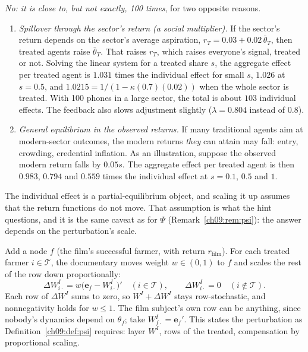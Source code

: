 \documentclass[../solutions_manual.tex]{subfiles}
\begin{document}
 \emph{No: it is close to, but not exactly, 100 times}, for two opposite reasons.
\begin{enumerate}
\item \emph{Spillover through the sector's return (a social multiplier).} If the sector's return depends on the sector's average aspiration, $r_T = 0.03 + 0.02\,\bar\theta_T$, then treated agents raise $\bar\theta_T$. That raises $r_T$, which raises everyone's signal, treated or not. Solving the linear system for a treated share $s$, the aggregate effect per treated agent is $1.031$ times the individual effect for small $s$, $1.026$ at $s = 0.5$, and $1.0215 = 1/(1 - \kappa(0.7)(0.02))$ when the whole sector is treated. With 100 phones in a large sector, the total is about $103$ individual effects. The feedback also slows adjustment slightly ($\lambda = 0.804$ instead of $0.8$).
\item \emph{General equilibrium in the observed returns.} If many traditional agents aim at modern-sector outcomes, the modern returns \emph{they} can attain may fall: entry, crowding, credential inflation. As an illustration, suppose the observed modern return falls by $0.05s$. The aggregate effect per treated agent is then $0.983$, $0.794$ and $0.559$ times the individual effect at $s = 0.1$, $0.5$ and $1$.
\end{enumerate}
The individual effect is a partial-equilibrium object, and scaling it up assumes that the return functions do not move. That assumption is what the hint questions, and it is the same caveat as for $\Psi$ (Remark~\ref{ch09:rem:psi}): the answer depends on the perturbation's scale.


 Add a node $f$ (the film's successful farmer, with return $r_{\text{film}}$). For each treated farmer $i \in \mathcal T$, the documentary moves weight $w \in (0,1)$ to $f$ and scales the rest of the row down proportionally:
\[
\Delta W^I_{i\cdot} = w\bigl(\mathbf e_f - W^I_{i\cdot}\bigr)' \quad (i \in \mathcal T), \qquad \Delta W^I_{i\cdot} = 0 \quad (i \notin \mathcal T).
\]
Each row of $\Delta W^I$ sums to zero, so $W^I + \Delta W^I$ stays row-stochastic, and nonnegativity holds for $w \le 1$. The film subject's own row can be anything, since nobody's dynamics depend on $\theta_f$; take $W^I_{f\cdot} = \mathbf e_f'$. This states the perturbation as Definition~\ref{ch09:def:psi} requires: layer $W^I$, rows of the treated, compensation by proportional scaling.
\end{document}

